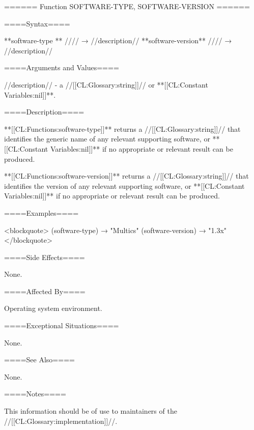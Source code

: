====== Function SOFTWARE-TYPE, SOFTWARE-VERSION ======

====Syntax====

**software-type ** //\noargs// → //description// **software-version** //\noargs// → //description//

====Arguments and Values====

//description// - a //[[CL:Glossary:string]]// or **[[CL:Constant Variables:nil]]**.

====Description====

**[[CL:Functions:software-type]]** returns a //[[CL:Glossary:string]]// that identifies the generic name of any relevant supporting software, or **[[CL:Constant Variables:nil]]** if no appropriate or relevant result can be produced.

**[[CL:Functions:software-version]]** returns a //[[CL:Glossary:string]]// that identifies the version of any relevant supporting software, or **[[CL:Constant Variables:nil]]** if no appropriate or relevant result can be produced.

====Examples====

<blockquote> (software-type) → "Multics" (software-version) → "1.3x" </blockquote>

====Side Effects====

None.

====Affected By====

Operating system environment.

====Exceptional Situations====

None.

====See Also====

None.

====Notes====

This information should be of use to maintainers of the //[[CL:Glossary:implementation]]//.

